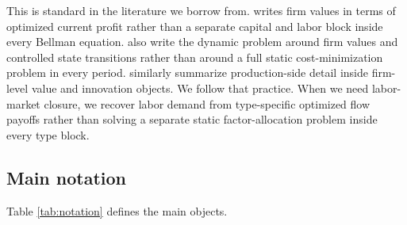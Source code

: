 \documentclass[12pt]{article}
\newcommand{\1}{\mathbf{1}}
\begin{document}
This is standard in the literature we borrow from. \citet{Hopenhayn1992} writes firm values in terms of optimized current profit rather than a separate capital and labor block inside every Bellman equation. \citet{EricsonPakes1995} also write the dynamic problem around firm values and controlled state transitions rather than around a full static cost-minimization problem in every period. \citet{KletteKortum2004} similarly summarize production-side detail inside firm-level value and innovation objects. We follow that practice. When we need labor-market closure, we recover labor demand from type-specific optimized flow payoffs rather than solving a separate static factor-allocation problem inside every type block.

\subsection{Main notation}

Table \ref{tab:notation} defines the main objects.

\clearpage
\end{document}
